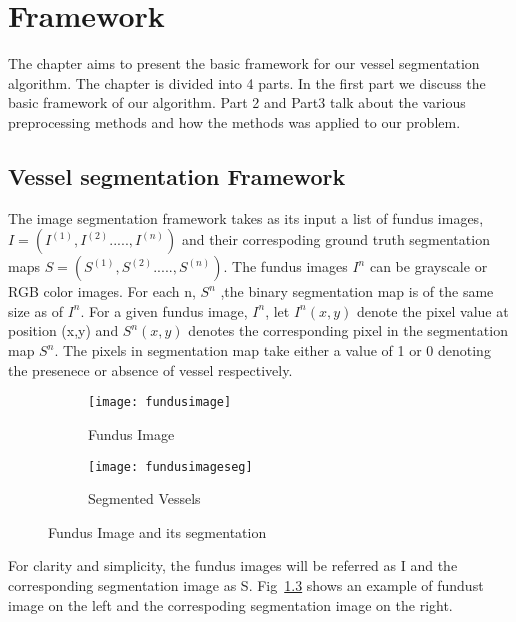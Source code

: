 \chapter{Framework}

\ifpdf
    \graphicspath{{Chapter3/Figs/Raster/}{Chapter3/Figs/PDF/}{Chapter3/Figs/}}
\else
    \graphicspath{{Chapter3/Figs/Vector/}{Chapter3/Figs/}}
\fi
The chapter aims to present the basic framework for our vessel segmentation algorithm.
The chapter is divided into 4 parts. In the first part we discuss the basic framework of our algorithm. Part 2 and Part3 talk about the various preprocessing methods and how the methods was applied to our problem.
\section{Vessel segmentation Framework}
The image segmentation framework takes as its input a list of fundus images, $I = (I^{(1)},I^{(2)}....., I^{(n)} )$  and their correspoding ground truth segmentation maps  $S = (S^{(1)},S^{(2)}....., S^{(n)} )$. The fundus images $I^n$ can be grayscale or RGB color images. For each n, $S^n$ ,the binary segmentation map is of the same size as of $I^n$. For a given fundus image, $I^n$, let $I^n(x,y)$ denote the pixel value at position (x,y) and $S^n(x,y)$ denotes the corresponding pixel in the segmentation map $S^n$. The pixels in segmentation map take either a value of 1 or 0 denoting the presenece or absence of vessel respectively.

\begin{figure}
	\centering
	\begin{subfigure}[b]{0.45\textwidth}
		\centering
		\texttt{[image: fundusimage]}
		\caption{Fundus Image}
		\label{fig:fundusex}
	\end{subfigure}
	\hfill
	\begin{subfigure}[b]{0.45\textwidth}
		\centering
		\texttt{[image: fundusimageseg]}
		\caption{Segmented Vessels}
		\label{fig:fundusex seg}
	\end{subfigure}
	\caption{Fundus Image and its segmentation}
	\label{fig:fundus example}
\end{figure}


For clarity and simplicity, the fundus images will be referred as I and the corresponding segmentation image as S. Fig~\ref{fig:fundus example} shows an example of fundust image on the left and the correspoding segmentation image on the right.

